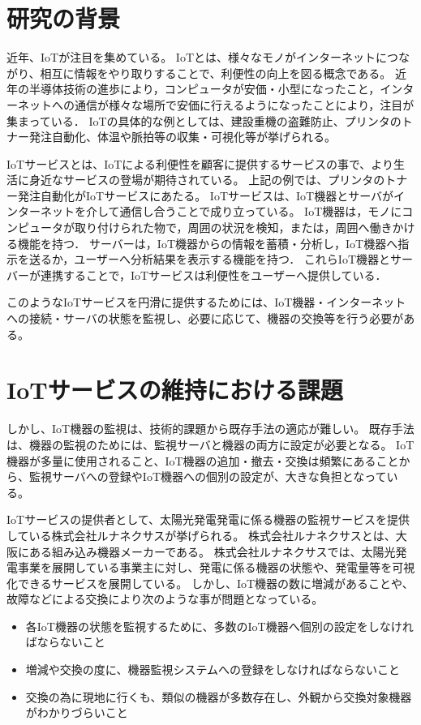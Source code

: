 \section{研究の背景}
近年、IoTが注目を集めている。
IoTとは、様々なモノがインターネットにつながり、相互に情報をやり取りすることで、利便性の向上を図る概念である。
近年の半導体技術の進歩により，コンピュータが安価・小型になったこと，インターネットへの通信が様々な場所で安価に行えるようになったことにより，注目が集まっている．
IoTの具体的な例としては、建設重機の盗難防止、プリンタのトナー発注自動化、体温や脈拍等の収集・可視化等が挙げられる。
\medskip

IoTサービスとは、IoTによる利便性を顧客に提供するサービスの事で、より生活に身近なサービスの登場が期待されている。
上記の例では、プリンタのトナー発注自動化がIoTサービスにあたる。
IoTサービスは、IoT機器とサーバがインターネットを介して通信し合うことで成り立っている。
IoT機器は，モノにコンピュータが取り付けられた物で，周囲の状況を検知，または，周囲へ働きかける機能を持つ．
サーバーは，IoT機器からの情報を蓄積・分析し，IoT機器へ指示を送るか，ユーザーへ分析結果を表示する機能を持つ．
これらIoT機器とサーバーが連携することで，IoTサービスは利便性をユーザーへ提供している．
\medskip

このようなIoTサービスを円滑に提供するためには、IoT機器・インターネットへの接続・サーバの状態を監視し、必要に応じて、機器の交換等を行う必要がある。


\section{IoTサービスの維持における課題}
しかし、IoT機器の監視は、技術的課題から既存手法の適応が難しい。
既存手法は、機器の監視のためには、監視サーバと機器の両方に設定が必要となる。
IoT機器が多量に使用されること、IoT機器の追加・撤去・交換は頻繁にあることから、監視サーバへの登録やIoT機器への個別の設定が、大きな負担となっている。


IoTサービスの提供者として、太陽光発電発電に係る機器の監視サービスを提供している株式会社ルナネクサスが挙げられる。
株式会社ルナネクサスとは、大阪にある組み込み機器メーカーである。
株式会社ルナネクサスでは、太陽光発電事業を展開している事業主に対し、発電に係る機器の状態や、発電量等を可視化できるサービスを展開している。
しかし、IoT機器の数に増減があることや、故障などによる交換により次のような事が問題となっている。
\begin{itemize}
\item 各IoT機器の状態を監視するために、多数のIoT機器へ個別の設定をしなければならないこと

\item 増減や交換の度に、機器監視システムへの登録をしなければならないこと

\item 交換の為に現地に行くも、類似の機器が多数存在し、外観から交換対象機器がわかりづらいこと

\end{itemize}


